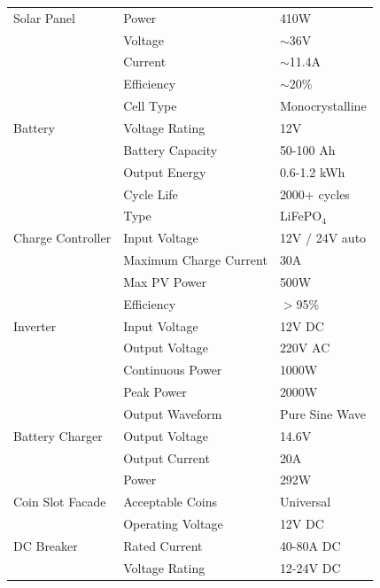 {\begin{longtable}{p{4cm} p{4.8cm} p{4cm}}
	\addlinespace[0.6em]
	
	Solar Panel & Power & 410W \\
	& Voltage & $\sim$36V \\
	& Current & $\sim$11.4A \\
	& Efficiency & $\sim$20\% \\
	& Cell Type & Monocrystalline \\
	
	\addlinespace[0.6em]
	
	Battery & Voltage Rating & 12V \\
	& Battery Capacity & 50-100 Ah \\
	& Output Energy & 0.6-1.2 kWh \\
	& Cycle Life & 2000+ cycles \\
	& Type & LiFePO$_4$ \\
	
	\addlinespace[0.6em]
	
	Charge Controller & Input Voltage & 12V / 24V auto \\
	& Maximum Charge Current & 30A \\
	& Max PV Power & 500W \\
	& Efficiency & $>$95\% \\
	
	\addlinespace[0.6em]
	
	Inverter & Input Voltage & 12V DC \\
	& Output Voltage & 220V AC \\
	& Continuous Power & 1000W \\
	& Peak Power & 2000W \\
	& Output Waveform & Pure Sine Wave \\
	
	\addlinespace[0.6em]
	
	Battery Charger & Output Voltage & 14.6V \\
	& Output Current & 20A \\
	& Power & 292W \\
	
	\addlinespace[0.6em]
	
	Coin Slot Facade & Acceptable Coins & Universal \\
	& Operating Voltage & 12V DC \\
	
	\addlinespace[0.6em]
	
	DC Breaker & Rated Current & 40-80A DC \\
	& Voltage Rating & 12-24V DC \\
	

\end{longtable}}

